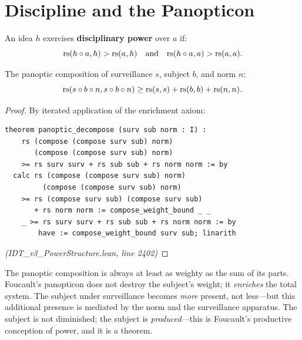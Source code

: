 \section{Discipline and the Panopticon}

\begin{definition}
\label{def:disciplinary}
An idea $h$ exercises \textbf{disciplinary power} over $a$ if:
\[
  \mathrm{rs}(h \circ a, h) > \mathrm{rs}(a, h) \quad\text{and}\quad \mathrm{rs}(h \circ a, a) > \mathrm{rs}(a, a).
\]
\end{definition}

\begin{theorem}
\label{thm:panoptic}
The panoptic composition of surveillance $s$, subject $b$, and norm $n$:
\[
  \mathrm{rs}(s \circ b \circ n, s \circ b \circ n) \geq \mathrm{rs}(s,s) + \mathrm{rs}(b,b) + \mathrm{rs}(n,n).
\]
\end{theorem}

\begin{proof}
By iterated application of the enrichment axiom:
\begin{lstlisting}
theorem panoptic_decompose (surv sub norm : I) :
    rs (compose (compose surv sub) norm)
       (compose (compose surv sub) norm)
    >= rs surv surv + rs sub sub + rs norm norm := by
  calc rs (compose (compose surv sub) norm)
         (compose (compose surv sub) norm)
    >= rs (compose surv sub) (compose surv sub)
       + rs norm norm := compose_weight_bound _ _
    _ >= rs surv surv + rs sub sub + rs norm norm := by
        have := compose_weight_bound surv sub; linarith
\end{lstlisting}
\textit{(IDT\_v3\_PowerStructure.lean, line 2402)}
\end{proof}

\begin{interpretation}
The panoptic composition is always at least as weighty as the sum of its parts.
Foucault's panopticon does not destroy the subject's weight; it \emph{enriches}
the total system. The subject under surveillance becomes \emph{more} present,
not less---but this additional presence is mediated by the norm and the
surveillance apparatus. The subject is not diminished; the subject is
\emph{produced}---this is Foucault's productive conception of power, and it
is a theorem.
\end{interpretation}

